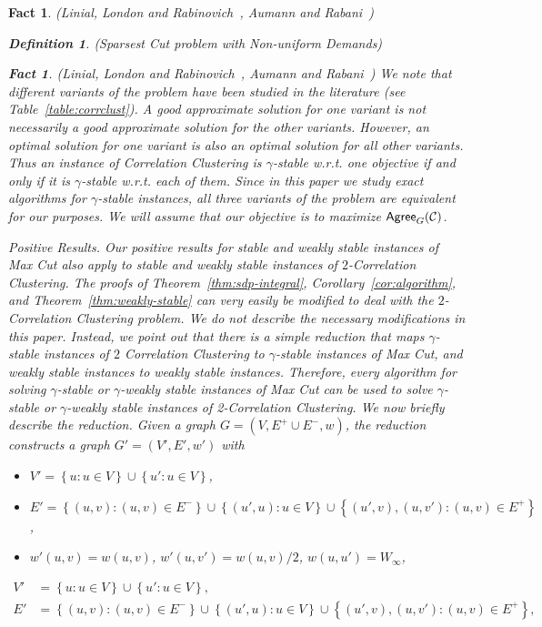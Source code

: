 \documentclass[twoside,leqno,twocolumn]{article}
\makeatletter
\def\paragraph{\@startsection  
 {paragraph}{4}{\parindent}{5pt}{-5pt}{\normalsize\bf}}
\newcommand {\set}   [1] {\left\{ #1 \right\}}
\newtheorem{Definition}[theorem]{Definition}
\newtheorem{fact}[theorem]{Fact}
\makeatother
\begin{document}
\begin{fact}{\sc (Linial, London and Rabinovich~\cite{LLR}, Aumann and Rabani~\cite{AR})}
\begin{Definition} {\sc (Sparsest Cut problem with Non-uniform Demands)}
\begin{fact}{\sc (Linial, London and Rabinovich~\cite{LLR}, Aumann and Rabani~\cite{AR})}
We note that different variants of the problem have been studied in the literature (see Table~\ref{table:corrclust}). 
A good \textit{approximate} solution for one variant is not necessarily a good approximate solution for the other variants.
However, an \textit{optimal} solution for one variant is also an optimal solution for all other variants.
Thus an instance of Correlation Clustering is $\gamma$-stable w.r.t. one objective if and only if it is 
$\gamma$-stable w.r.t. each of them. Since in this paper we study exact algorithms for $\gamma$-stable instances, 
all three variants of the problem are equivalent for our purposes. We will assume that our objective is to maximize 
$\mathsf{Agree}_G({\cal C})$.


\paragraph{Positive Results.} Our positive results for stable and weakly stable instances of Max Cut also apply to stable and weakly stable instances of
$2$-Correlation Clustering. The proofs of Theorem~\ref{thm:sdp-integral}, Corollary~\ref{cor:algorithm}, and 
Theorem~\ref{thm:weakly-stable} can very easily be modified to deal with the $2$-Correlation Clustering problem.
We do not describe the necessary modifications in this paper. Instead, we point out that there is a simple reduction that maps
$\gamma$-stable instances of $2$ Correlation Clustering to $\gamma$-stable instances of Max Cut, and weakly stable instances to 
weakly stable instances. Therefore, every algorithm for solving $\gamma$-stable or $\gamma$-weakly stable instances of Max Cut
can be used to solve $\gamma$-stable or $\gamma$-weakly stable instances of 2-Correlation Clustering.
We now briefly describe the reduction.
Given a graph $G = (V,E^+ \cup E^-,w)$, the reduction constructs a graph $G'=(V', E', w')$ with
\ifSODA
\begin{itemize}
\item $V' = \set{u:u\in V} \cup \set{u':u\in V}$,
\item $E'  = \set{(u,v): (u,v) \in E^-} \cup \set{(u',u): u\in V} \cup \set{(u',v), (u,v'): (u,v) \in E^+}$,
\item $w'(u,v) = w(u,v)$, $w'(u,v') = w(u,v) /2$, $w(u,u') = W_{\infty}$,
\end{itemize}
\else
\begin{align*}
V' &= \set{u:u\in V} \cup \set{u':u\in V}, \\
E' & = \set{(u,v): (u,v) \in E^-} \cup \set{(u',u): u\in V} \cup \set{(u',v), (u,v'): (u,v) \in E^+},\\

\end{align*}
\end{fact}
\end{Definition}
\end{fact}
\end{document}
